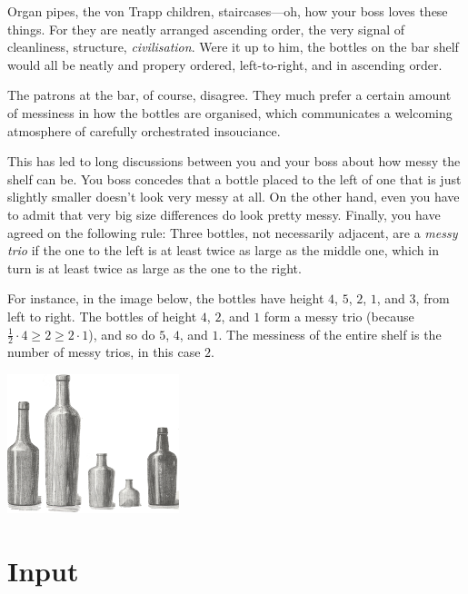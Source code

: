 

Organ pipes, the von Trapp children, staircases---oh, how your boss loves these things.
For they are neatly arranged ascending order, the very signal of cleanliness, structure, \emph{civilisation}.
Were it up to him, the bottles on the bar shelf would all be neatly and propery ordered, left-to-right, and in ascending order.

The patrons at the bar, of course, disagree.
They much prefer a certain amount of messiness in how the bottles are organised, which communicates a welcoming atmosphere of carefully orchestrated insouciance. 

This has led to long discussions between you and your boss about how messy the shelf can be.
You boss concedes that a bottle placed to the left of one that is just slightly smaller doesn't look very messy at all.
On the other hand, even you have to admit that very big size differences do look pretty messy.
Finally, you have agreed on the following rule:
Three bottles, not necessarily adjacent, are a \emph{messy trio} if the one to the left is at least twice as large as the middle one, which in turn is at least twice as large as the one to the right.

\medskip
For instance, in the image below, the bottles have height $4$, $5$, $2$, $1$, and $3$, from left to right.
The bottles of height $4$, $2$, and $1$ form a messy trio (because $\frac12 \cdot 4 \geq 2\geq 2\cdot  1$), and so do $5$, $4$, and $1$.
The messiness of the entire shelf is the number of messy trios, in this case $2$.

\medskip
\includegraphics[width = 5cm]{img/messy_bottles.png}



\section*{Input}

